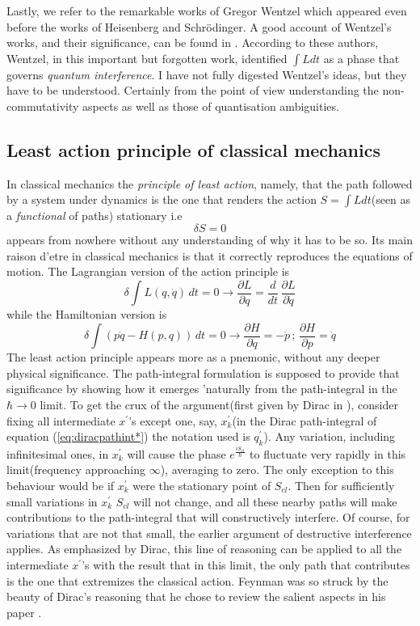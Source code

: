\documentclass[12pt]{article}
\newcommand{\be}{\begin{equation}}
\newcommand{\ee}{\end{equation}}
\begin{document}
Lastly, we refer to the remarkable works of Gregor Wentzel \cite{wentzel1,wentzel2} which appeared even before the works of Heisenberg and 
Schr\"odinger. A good account of Wentzel's works, and their significance, can be found in \cite{antoci}. According to these authors, Wentzel,
in this important but forgotten work, identified $ \int L dt$ as a phase that governs \emph{quantum interference}. I have not fully
digested Wentzel's ideas, but they have to be understood. Certainly from the point of view understanding the non-commutativity aspects as well
as those of quantisation ambiguities.

\subsection{Least action principle of classical mechanics}
In classical mechanics the {\it principle of least action}, namely, that the path followed by a system under dynamics is the one
that renders the action $S =  \int L dt$(seen as a {\it functional} of paths) stationary i.e
\be
\label{eq:leastactioncm}
\delta S = 0
\ee
appears from nowhere without any understanding of why it has to be so. Its main raison d'etre in classical mechanics is that it correctly
reproduces the equations of motion. The Lagrangian version of the action principle is
\be
\label{eq:eulerlagrange}
\delta  \int L(q,{\dot q})\,dt = 0 \rightarrow \frac{\partial L}{\partial q} = \frac{d}{dt}\,\frac{\partial L}{\partial {\dot q}}
\ee
while the Hamiltonian version is
\be
\label{eq:hamiltoneqns}
\delta  \int (p{\dot q} - H(p,q))\,dt = 0 \rightarrow \frac{\partial H}{\partial q} = - {\dot p}\,;\,\frac{\partial H}{\partial p} = {\dot q}
\ee
The least action principle appears more as a pnemonic, without any deeper physical significance. The path-integral formulation is supposed
to provide that significance by showing how it emerges 'naturally from the path-integral in the $\hbar \rightarrow 0$ limit. To get the
crux of the argument(first given by Dirac in \cite{diracpaper}), consider fixing all intermediate $x^\prime$'s except one, say,
$x_k^\prime$(in the Dirac path-integral of equation (\ref{eq:diracpathint*}) the notation used is $q_k^\prime$). 
Any variation,
including infinitesimal ones,
in $x_k^\prime$ will cause the phase $e^{\frac{iS_{cl}}{\hbar}}$ to fluctuate very rapidly in this limit(frequency approaching $\infty$), 
averaging to zero.
The only exception to this behaviour would be if $x_k^\prime$ were the stationary point of $S_{cl}$. Then for sufficiently small variations 
in $x_k^\prime$ 
$S_{cl}$ will not change, and all these nearby paths will make contributions to the path-integral that will constructively interfere. 
Of course, for
variations that are not that small, the earlier argument of destructive interference applies. As emphasized by Dirac, this line of
reasoning can be applied to all the intermediate $x^\prime$'s with the result that in this limit, the only path that contributes is the one that
extremizes the classical action. Feynman was so struck by the beauty of Dirac's reasoning that he chose to review the salient aspects in
his paper \cite{feynpaper}.
\end{document}
